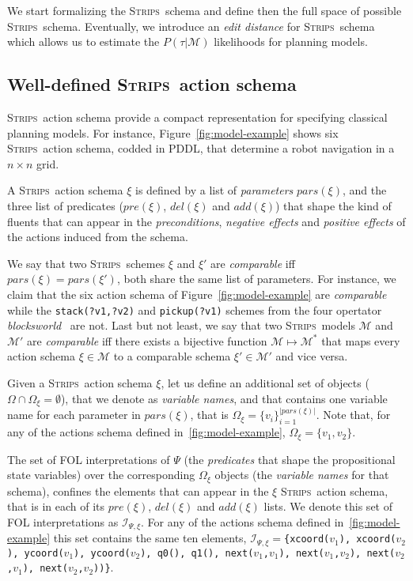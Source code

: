 \documentclass[letterpaper]{article} %
\newcommand{\strips}{\textsc{Strips}}     %
\begin{document}
We start formalizing the \strips\ schema and define then the full space of possible \strips\ schema. Eventually, we introduce an {\em edit distance} for \strips\ schema which allows us to estimate the $P(\tau|\mathcal{M})$ likelihoods for planning models.

\subsection{Well-defined \strips\ action schema}
\strips\ action schema provide a compact representation for specifying classical planning models. For instance, Figure~\ref{fig:model-example} shows six \strips\ action schema, codded in PDDL, that determine a robot navigation in a $n\times n$ grid.

A \strips\ action schema $\xi$ is defined by a list of {\em parameters} $pars(\xi)$, and the three list of predicates ($pre(\xi)$, $del(\xi)$ and $add(\xi)$) that shape the kind of fluents that can appear in the {\em preconditions}, {\em negative effects} and {\em positive effects} of the actions induced from the schema.

We say that two \strips\ schemes $\xi$ and $\xi'$ are {\em comparable} iff $pars(\xi)=pars(\xi')$, both share the same list of parameters. For instance, we claim that the six action schema of Figure~\ref{fig:model-example} are {\em comparable} while the {\small\tt stack(?v1,?v2)} and {\small\tt pickup(?v1)} schemes from the four opertator {\em blocksworld}~\cite{slaney2001blocks} are not. Last but not least, we say that two \strips\ models $\mathcal{M}$ and $\mathcal{M}'$ are {\em comparable} iff there exists a bijective function $\mathcal{M} \mapsto \mathcal{M}^*$ that maps every action schema $\xi\in\mathcal{M}$ to a comparable schema $\xi'\in\mathcal{M'}$ and vice versa.

Given a \strips\ action schema $\xi$, let us define an additional set of objects ($\Omega\cap\Omega_\xi=\emptyset$), that we denote as {\em variable names}, and that contains one variable name for each parameter in $pars(\xi)$, that is $\Omega_\xi=\{v_i\}_{i=1}^{|pars(\xi)|}$. Note that, for any of the actions schema defined in~\ref{fig:model-example}, $\Omega_\xi=\{v_1,v_2\}$.

The set of FOL interpretations of $\Psi$ (the {\em predicates} that shape the propositional state variables) over the corresponding $\Omega_\xi$ objects (the {\em variable names} for that schema), confines the elements that can appear in the $\xi$ \strips\ action schema, that is in each of its $pre(\xi)$, $del(\xi)$ and $add(\xi)$ lists. We denote this set of FOL interpretations as ${\mathcal I}_{\Psi,\xi}$. For any of the actions schema defined in~\ref{fig:model-example} this set contains the same ten elements, ${\mathcal I}_{\Psi,\xi}=${\small\tt\{xcoord($v_1$), xcoord($v_2$), ycoord($v_1$), ycoord($v_2$), q0(), q1(), next($v_1$,$v_1$), next($v_1$,$v_2$), next($v_2$,$v_1$), next($v_2$,$v_2$))\}}.
\end{document}
